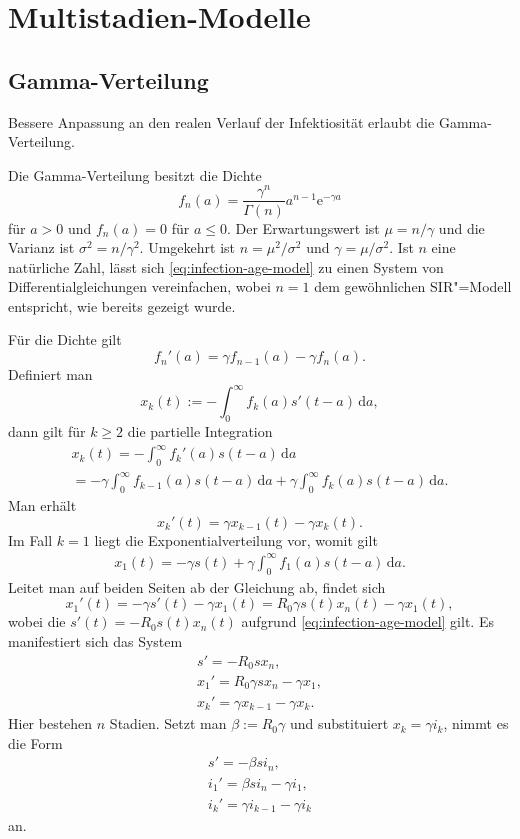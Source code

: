 \documentclass[a4paper,10pt,fleqn,twocolumn,twoside,dvipdfmx]{scrartcl}
\numberwithin{equation}{section}
\newcommand{\ee}{\mathrm e}
\begin{document}
\section{Multistadien-Modelle}

\subsection{Gamma-Verteilung}

Bessere Anpassung an den realen Verlauf der Infektiosität erlaubt die
Gamma-Verteilung.

Die Gamma-Verteilung besitzt die Dichte
\[f_n(a) = \frac{\gamma^n}{\Gamma(n)}a^{n-1}\ee^{-\gamma a}\]
für $a>0$ und $f_n(a)=0$ für $a\le 0$. Der Erwartungswert ist
$\mu = n/\gamma$ und die Varianz ist $\sigma^2 = n/\gamma^2$.
Umgekehrt ist $n=\mu^2/\sigma^2$ und $\gamma=\mu/\sigma^2$.
Ist $n$ eine natürliche
Zahl, lässt sich \eqref{eq:infection-age-model} zu einen System
von Differentialgleichungen vereinfachen, wobei $n=1$ dem gewöhnlichen
SIR"=Modell entspricht, wie bereits gezeigt wurde.

Für die Dichte gilt
\[f_n'(a) = \gamma f_{n-1}(a)-\gamma f_n(a).\]
Definiert man
\[x_k(t) := -\int_0^\infty f_k(a)s'(t-a)\,\mathrm da,\]
dann gilt für $k\ge 2$ die partielle Integration
\begin{gather*}
x_k(t) = -\int_0^\infty f_k'(a)s(t-a)\,\mathrm da\\
= -\gamma\!\int_0^\infty \!\!\!\! f_{k-1}(a)s(t-a)\,\mathrm da
+ \gamma\!\int_0^\infty \!\!\!\! f_k(a)s(t-a)\,\mathrm da.
\end{gather*}
Man erhält
\[x_k'(t) = \gamma x_{k-1}(t) - \gamma x_k(t).\]
Im Fall $k=1$ liegt die Exponentialverteilung vor, womit gilt
\begin{gather*}
x_1(t) = -\gamma s(t) + \gamma\int_0^\infty f_1(a)s(t-a)\,\mathrm da.
\end{gather*}
Leitet man auf beiden Seiten ab der Gleichung ab, findet sich%
\[x_1'(t) = -\gamma s'(t) - \gamma x_1(t) = R_0\gamma s(t)x_n(t) - \gamma x_1(t),\]
wobei die $s'(t) = -R_0 s(t)x_n(t)$ aufgrund
\eqref{eq:infection-age-model} gilt.
Es manifestiert sich das System
\begin{gather*}
s' = -R_0 sx_n,\\
x_1' = R_0\gamma sx_n - \gamma x_1,\\
x_k' = \gamma x_{k-1}-\gamma x_k.
\end{gather*}
Hier bestehen $n$ Stadien. Setzt man $\beta:=R_0\gamma$ und
substituiert $x_k=\gamma i_k$, nimmt es die Form
\begin{gather*}
s' = -\beta s i_n,\\
i_1' = \beta s i_n - \gamma i_1,\\
i_k' = \gamma i_{k-1}-\gamma i_k
\end{gather*}
an.
\end{document}
